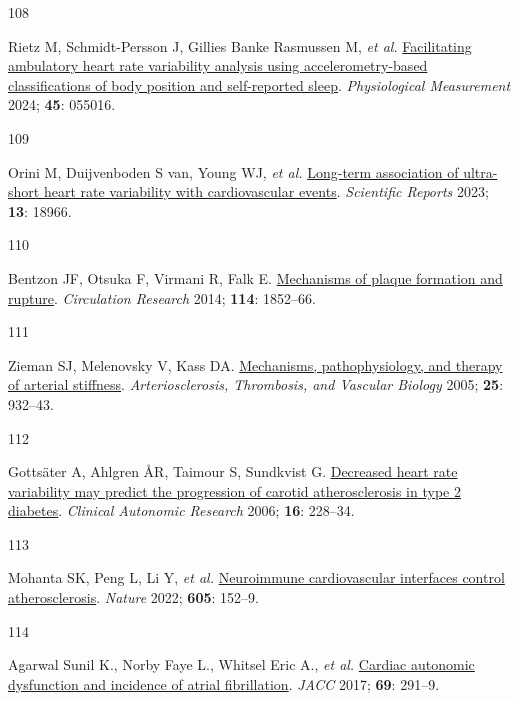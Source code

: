 \documentclass[
  a4paper,
  headsepline=true,
  open=left]{scrbook}
\newlength{\cslhangindent}
\newlength{\csllabelwidth}
\newlength{\cslentryspacingunit} %
\newenvironment{CSLReferences}[2] %
 {%
  \setlength{\parindent}{0pt}
  \ifodd #1
  \let\oldpar\par
  \def\par{\hangindent=\cslhangindent\oldpar}
  \fi
  \setlength{\parskip}{#2\cslentryspacingunit}
 }%
 {}
\newcommand{\CSLLeftMargin}[1]{\parbox[t]{\csllabelwidth}{#1}}
\newcommand{\CSLRightInline}[1]{\parbox[t]{\linewidth - \csllabelwidth}{#1}\break}
\begin{document}
\begin{CSLReferences}{0}{0}
\leavevmode{}%
\CSLLeftMargin{108 }%
\CSLRightInline{Rietz M, Schmidt-Persson J, Gillies Banke Rasmussen M,
\emph{et al.}
\href{https://doi.org/10.1088/1361-6579/ad450d}{Facilitating ambulatory
heart rate variability analysis using accelerometry-based
classifications of body position and self-reported sleep}.
\emph{Physiological Measurement} 2024; \textbf{45}: 055016.}

\leavevmode{}%
\CSLLeftMargin{109 }%
\CSLRightInline{Orini M, Duijvenboden S van, Young WJ, \emph{et al.}
\href{https://doi.org/10.1038/s41598-023-45988-2}{Long-term association
of ultra-short heart rate variability with cardiovascular events}.
\emph{Scientific Reports} 2023; \textbf{13}: 18966.}

\leavevmode{}%
\CSLLeftMargin{110 }%
\CSLRightInline{Bentzon JF, Otsuka F, Virmani R, Falk E.
\href{https://doi.org/10.1161/CIRCRESAHA.114.302721}{Mechanisms of
plaque formation and rupture}. \emph{Circulation Research} 2014;
\textbf{114}: 1852--66.}

\leavevmode{}%
\CSLLeftMargin{111 }%
\CSLRightInline{Zieman SJ, Melenovsky V, Kass DA.
\href{https://doi.org/10.1161/01.ATV.0000160548.78317.29}{Mechanisms,
pathophysiology, and therapy of arterial stiffness}.
\emph{Arteriosclerosis, Thrombosis, and Vascular Biology} 2005;
\textbf{25}: 932--43.}

\leavevmode{}%
\CSLLeftMargin{112 }%
\CSLRightInline{Gottsäter A, Ahlgren ÅR, Taimour S, Sundkvist G.
\href{https://doi.org/10.1007/s10286-006-0345-4}{Decreased heart rate
variability may predict the progression of carotid atherosclerosis in
type 2 diabetes}. \emph{Clinical Autonomic Research} 2006; \textbf{16}:
228--34.}

\leavevmode{}%
\CSLLeftMargin{113 }%
\CSLRightInline{Mohanta SK, Peng L, Li Y, \emph{et al.}
\href{https://doi.org/10.1038/s41586-022-04673-6}{Neuroimmune
cardiovascular interfaces control atherosclerosis}. \emph{Nature} 2022;
\textbf{605}: 152--9.}

\leavevmode{}%
\CSLLeftMargin{114 }%
\CSLRightInline{Agarwal Sunil K., Norby Faye L., Whitsel Eric A.,
\emph{et al.} \href{https://doi.org/10.1016/j.jacc.2016.10.059}{Cardiac
autonomic dysfunction and incidence of atrial fibrillation}. \emph{JACC}
2017; \textbf{69}: 291--9.}


\end{CSLReferences}
\end{document}
